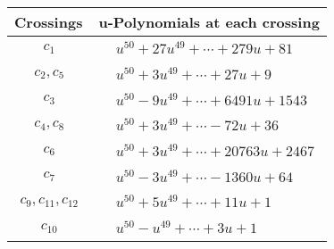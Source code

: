 \documentclass[1p]{elsarticle_modified}
\theoremstyle{definition}
\begin{document}
\begin{tabular}{m{50pt}|m{274pt}}
Crossings & \hspace{64pt}u-Polynomials at each crossing \\
\hline $$\begin{aligned}c_{1}\end{aligned}$$&$\begin{aligned}
&u^{50}+27 u^{49}+\cdots+279 u+81
\end{aligned}$\\
\hline $$\begin{aligned}c_{2},c_{5}\end{aligned}$$&$\begin{aligned}
&u^{50}+3 u^{49}+\cdots+27 u+9
\end{aligned}$\\
\hline $$\begin{aligned}c_{3}\end{aligned}$$&$\begin{aligned}
&u^{50}-9 u^{49}+\cdots+6491 u+1543
\end{aligned}$\\
\hline $$\begin{aligned}c_{4},c_{8}\end{aligned}$$&$\begin{aligned}
&u^{50}+3 u^{49}+\cdots-72 u+36
\end{aligned}$\\
\hline $$\begin{aligned}c_{6}\end{aligned}$$&$\begin{aligned}
&u^{50}+3 u^{49}+\cdots+20763 u+2467
\end{aligned}$\\
\hline $$\begin{aligned}c_{7}\end{aligned}$$&$\begin{aligned}
&u^{50}-3 u^{49}+\cdots-1360 u+64
\end{aligned}$\\
\hline $$\begin{aligned}c_{9},c_{11},c_{12}\end{aligned}$$&$\begin{aligned}
&u^{50}+5 u^{49}+\cdots+11 u+1
\end{aligned}$\\
\hline $$\begin{aligned}c_{10}\end{aligned}$$&$\begin{aligned}
&u^{50}- u^{49}+\cdots+3 u+1
\end{aligned}$\\
\hline
\end{tabular}\\~\\
\end{document}
